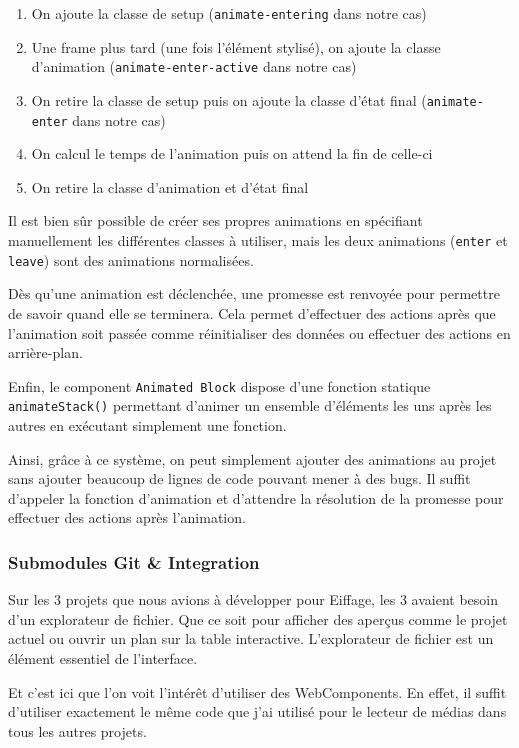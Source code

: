 \begin{enumerate}
    \item On ajoute la classe de setup (\texttt{animate-entering} dans notre cas)
    \item Une frame plus tard (une fois l'élément stylisé), on ajoute la classe d'animation (\texttt{animate-enter-active} dans notre cas)
    \item On retire la classe de setup puis on ajoute la classe d'état final (\texttt{animate-enter} dans notre cas)
    \item On calcul le temps de l'animation puis on attend la fin de celle-ci
    \item On retire la classe d'animation et d'état final
\end{enumerate}

Il est bien sûr possible de créer ses propres animations en spécifiant manuellement les différentes classes à utiliser, mais les deux animations (\texttt{enter} et \texttt{leave}) sont des animations normalisées.

Dès qu'une animation est déclenchée, une promesse est renvoyée pour permettre de savoir quand elle se terminera.
Cela permet d'effectuer des actions après que l'animation soit passée comme réinitialiser des données ou effectuer des actions en arrière-plan.

Enfin, le component \texttt{Animated Block} dispose d'une fonction statique \texttt{animateStack()} permettant d'animer un ensemble d'éléments les uns après les autres en exécutant simplement une fonction.

Ainsi, grâce à ce système, on peut simplement ajouter des animations au projet sans ajouter beaucoup de lignes de code pouvant mener à des bugs.
Il suffit d'appeler la fonction d'animation et d'attendre la résolution de la promesse pour effectuer des actions après l'animation.

\subsubsection{Submodules Git \& Integration}

Sur les 3 projets que nous avions à développer pour Eiffage, les 3 avaient besoin d'un explorateur de fichier.
Que ce soit pour afficher des aperçus comme le projet actuel ou ouvrir un plan sur la table interactive.
L'explorateur de fichier est un élément essentiel de l'interface.

Et c'est ici que l'on voit l'intérêt d'utiliser des WebComponents.
En effet, il suffit d'utiliser exactement le même code que j'ai utilisé pour le lecteur de médias dans tous les autres projets.

